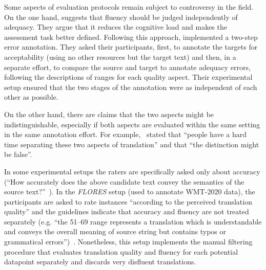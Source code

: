 Some aspects of evaluation protocols remain subject to controversy in the field. On the one hand, \citet{Graham2013, Graham2015} suggests that fluency should be judged independently of adequacy. 
They argue that it reduces the cognitive load and makes the assessment task better defined. Following this approach, \citet{Daems2013} implemented a two-step error annotation. They asked their participants, first, to annotate the targets for acceptability (using no other resources but the target text) and then, in a separate effort, to compare the source and target to annotate adequacy errors, following the descriptions of ranges for each quality aspect. Their experimental setup ensured that the two stages of the annotation were as independent of each other as possible. %

On the other hand, there are claims that the two aspects might be indistinguishable, especially if both aspects are evaluated within the same setting in the same annotation effort. For example,~\citet[p.140]{CallisonBurch2007} stated that ``people have a hard time separating these two aspects of translation'' and that ``the distinction might be false''.

In some experimental setups the raters are specifically asked only about accuracy (``How accurately does the above candidate text convey the semantics of the source text?''~\cite{Hassan2018}). 
In the \textit{FLORES} setup (used to annotate WMT-2020 data), the participants are asked to rate instances ``according to the perceived translation quality'' and the guidelines indicate that accuracy and fluency are not treated separately (e.g. ``the 51--69 range represents a translation which is understandable and conveys the overall meaning of source string but contains typos or grammatical errors'')~\cite[p.6109]{Guzman2019}. Nonetheless, this setup implements the manual filtering procedure that evaluates translation quality and fluency for each potential datapoint separately and discards very disfluent translations. 

